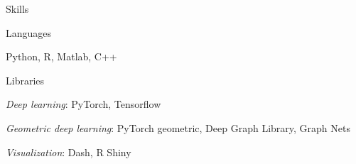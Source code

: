 \documentclass{resume} %
\begin{document}
\begin{rSection}{Skills}

\begin{rSubsection}{Languages}{}{}{}
\item[] Python, R, Matlab, C++
\end{rSubsection}

\begin{rSubsection}{Libraries}{}{}{}
\item[] {\it Deep learning}: PyTorch, Tensorflow
\item[] {\it Geometric deep learning}: PyTorch geometric, Deep Graph Library, Graph Nets
\item[] {\it Visualization}: Dash, R Shiny
\end{rSubsection}

\end{rSection}


\end{document}
